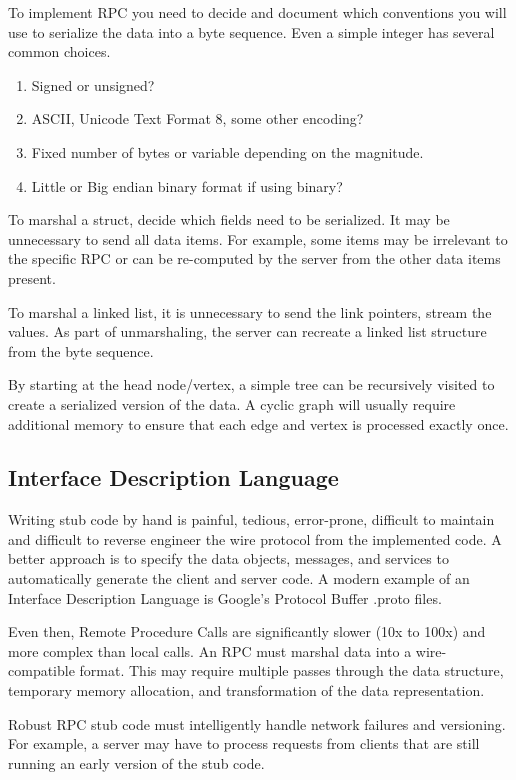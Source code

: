 To implement RPC you need to decide and document which conventions you will use to serialize the data into a byte sequence.
Even a simple integer has several common choices.

\begin{enumerate}
\item Signed or unsigned?
\item ASCII, Unicode Text Format 8, some other encoding?
\item Fixed number of bytes or variable depending on the magnitude.
\item Little or Big endian binary format if using binary?
\end{enumerate}

To marshal a struct, decide which fields need to be serialized.
It may be unnecessary to send all data items.
For example, some items may be irrelevant to the specific RPC or can be re-computed by the server from the other data items present.

To marshal a linked list, it is unnecessary to send the link pointers, stream the values.
As part of unmarshaling, the server can recreate a linked list structure from the byte sequence.

By starting at the head node/vertex, a simple tree can be recursively visited to create a serialized version of the data.
A cyclic graph will usually require additional memory to ensure that each edge and vertex is processed exactly once.

\subsection{Interface Description Language}

Writing stub code by hand is painful, tedious, error-prone, difficult to maintain and difficult to reverse engineer the wire protocol from the implemented code.
A better approach is to specify the data objects, messages, and services to automatically generate the client and server code.
A modern example of an Interface Description Language is Google's Protocol Buffer .proto files.

Even then, Remote Procedure Calls are significantly slower (10x to 100x) and more complex than local calls.
An RPC must marshal data into a wire-compatible format.
This may require multiple passes through the data structure, temporary memory allocation, and transformation of the data representation.

Robust RPC stub code must intelligently handle network failures and versioning.
For example, a server may have to process requests from clients that are still running an early version of the stub code.

